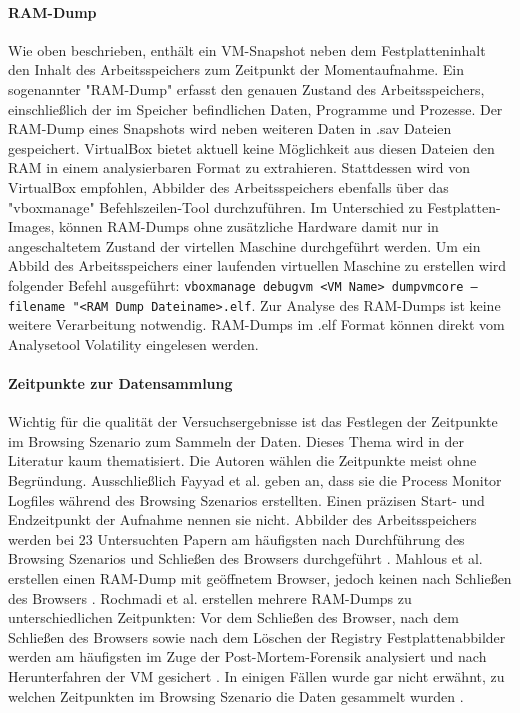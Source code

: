 \paragraph*{RAM-Dump}

Wie oben beschrieben, enthält ein VM-Snapshot neben dem Festplatteninhalt den Inhalt des Arbeitsspeichers zum Zeitpunkt der Momentaufnahme.
Ein sogenannter "RAM-Dump" erfasst den genauen Zustand des Arbeitsspeichers, einschließlich der im Speicher befindlichen Daten, Programme und Prozesse.
Der RAM-Dump eines Snapshots wird neben weiteren Daten in .sav Dateien gespeichert. 
VirtualBox bietet aktuell keine Möglichkeit aus diesen Dateien den RAM in einem analysierbaren Format zu extrahieren.
Stattdessen wird von VirtualBox empfohlen, Abbilder des Arbeitsspeichers ebenfalls über das "vboxmanage" Befehlszeilen-Tool durchzuführen.
Im Unterschied zu Festplatten-Images, können RAM-Dumps ohne zusätzliche Hardware damit nur in angeschaltetem Zustand der virtellen Maschine durchgeführt werden. 
Um ein Abbild des Arbeitsspeichers einer laufenden virtuellen Maschine zu erstellen wird folgender Befehl ausgeführt: \texttt{vboxmanage debugvm <VM Name> dumpvmcore --filename "<RAM Dump Dateiname>.elf}. Zur Analyse des RAM-Dumps ist keine weitere Verarbeitung notwendig. RAM-Dumps im .elf Format können direkt vom Analysetool Volatility eingelesen werden.		

\paragraph*{Zeitpunkte zur Datensammlung}
Wichtig für die qualität der Versuchsergebnisse ist das Festlegen der Zeitpunkte im Browsing Szenario zum Sammeln der Daten.
Dieses Thema wird in der Literatur kaum thematisiert. Die Autoren wählen die Zeitpunkte meist ohne Begründung.
Ausschließlich Fayyad et al. geben an, dass sie die Process Monitor Logfiles während des Browsing Szenarios erstellten. Einen präzisen Start- und Endzeitpunkt der Aufnahme nennen sie nicht.
Abbilder des Arbeitsspeichers werden bei 23 Untersuchten Papern am häufigsten nach Durchführung des Browsing Szenarios und Schließen des Browsers durchgeführt \cite{Hariharan.2022, Izzati.2022, Md.2018, Ohana.2013}. Mahlous et al. erstellen einen RAM-Dump mit geöffnetem Browser, jedoch keinen nach Schließen des Browsers \cite{Mahlous.2020}.
Rochmadi et al. erstellen mehrere RAM-Dumps zu unterschiedlichen Zeitpunkten: Vor dem Schließen des Browser, nach dem Schließen des Browsers sowie nach dem Löschen der Registry \cite{Rochmadi.2017}
Festplattenabbilder werden am häufigsten im Zuge der Post-Mortem-Forensik analysiert und nach Herunterfahren der VM gesichert \cite{Fayyad.2021, Mahlous.2020, Horsman.2019, Md.2018, Gabet.2018, Montasari.2015, Chivers.2014, Ohana.2013}.
In einigen Fällen wurde gar nicht erwähnt, zu welchen Zeitpunkten im Browsing Szenario die Daten gesammelt wurden \cite{Sajan.2021, Nalawade.2016, Montasari.2015, Satvat.2014, Said.2011, Aggarwal.2010}.

